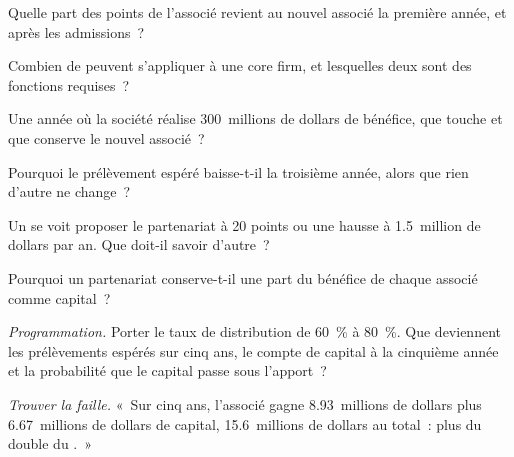 \begin{exercise}[$\star$]\label{exo:in:leadership-roles:1}
Quelle part des points de l'associé revient au nouvel associé la première année, et après les admissions~?
\end{exercise}

\begin{exercise}[$\star$]\label{exo:in:leadership-roles:2}
Combien de  peuvent s'appliquer à une core firm, et lesquelles deux sont des fonctions requises~?
\end{exercise}

\begin{exercise}[$\star$]\label{exo:in:leadership-roles:3}
Une année où la société réalise 300~millions de dollars de bénéfice, que touche et que conserve le nouvel associé~?
\end{exercise}

\begin{exercise}[$\star\star$]\label{exo:in:leadership-roles:4}
Pourquoi le prélèvement espéré baisse-t-il la troisième année, alors que rien d'autre ne change~?
\end{exercise}

\begin{exercise}[$\star\star$]\label{exo:in:leadership-roles:5}
Un  se voit proposer le partenariat à 20 points ou une hausse à 1.5~million de dollars par an. Que doit-il savoir d'autre~?
\end{exercise}

\begin{exercise}[$\star\star$]\label{exo:in:leadership-roles:6}
Pourquoi un partenariat conserve-t-il une part du bénéfice de chaque associé comme capital~?
\end{exercise}

\begin{exercise}[$\star\star\star$]\label{exo:in:leadership-roles:7}
\emph{Programmation.} Porter le taux de distribution de 60~\% à 80~\%. Que deviennent les prélèvements espérés sur cinq ans, le compte de capital
à la cinquième année et la probabilité que le capital passe sous l'apport~?
\end{exercise}

\begin{exercise}[$\star\star\star$]\label{exo:in:leadership-roles:8}
\emph{Trouver la faille.} «~Sur cinq ans, l'associé gagne 8.93~millions de dollars plus 6.67~millions de dollars de capital, 15.6~millions
de dollars au total~: plus du double du .~»
\end{exercise}

